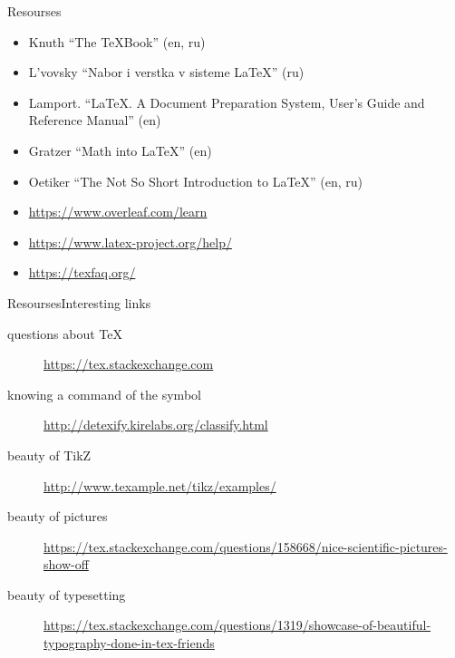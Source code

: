 \begin{frame}{Resourses}%

\vspace{-3.0ex}
\begin{itemize}
    \item Knuth ``The \TeX Book'' (en, ru)
    \item L'vovsky ``Nabor i verstka v sisteme \LaTeX'' (ru)
    \item Lamport. ``\LaTeX. A Document Preparation System, User’s Guide and Reference Manual'' (en)
    \item Gratzer ``Math into \LaTeX'' (en) 
    \item Oetiker ``The Not So Short Introduction to \LaTeX'' (en, ru)
    \item \url{https://www.overleaf.com/learn}
    \item \url{https://www.latex-project.org/help/}
    \item \url{https://texfaq.org/}
\end{itemize}
\end{frame}


\begin{frame}[fragile]{Resourses}{Interesting links}
\cprotect{}
\small
\begin{description}
    \item[questions about \TeX] \url{https://tex.stackexchange.com} \vspace{-1ex}
    \item[knowing a command of the symbol] \url{http://detexify.kirelabs.org/classify.html} \vspace{-1ex}
    \item[beauty of TikZ] \url{http://www.texample.net/tikz/examples/} \vspace{-1ex}
    \item[beauty of pictures] \url{https://tex.stackexchange.com/questions/158668/nice-scientific-pictures-show-off}\vspace{-1ex}
    \item[beauty of typesetting] \url{https://tex.stackexchange.com/questions/1319/showcase-of-beautiful-typography-done-in-tex-friends}\vspace{-1ex}
\end{description}
\end{frame}

